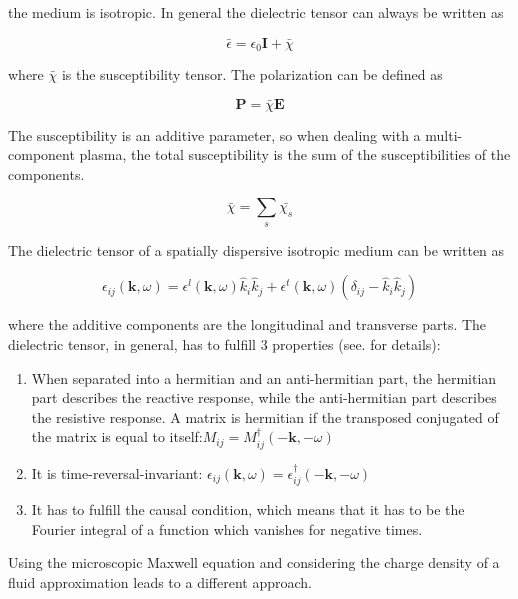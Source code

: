 \documentclass[a4paper,11pt]{article}
\begin{document}
the medium is isotropic. In general the dielectric tensor can always be written as

\begin{equation}
    \bar{\epsilon}=\epsilon_0\mathbf{I}+\bar{\chi}
\end{equation}

where $\bar{\chi}$ is the susceptibility tensor. The polarization can be defined as

\begin{equation}
    \mathbf{P}=\bar{\chi} \mathbf{E}
\end{equation}

The susceptibility is an additive parameter, so when dealing with a multi-component plasma, the total susceptibility is the sum of the susceptibilities of the components.

\begin{equation}
    \bar{\chi}=\sum_s \bar{\chi_s}
\end{equation}


The dielectric tensor of a spatially dispersive isotropic medium can be written as

\begin{equation}
   \epsilon_{ij}(\mathbf{k},\omega)=\epsilon^l(\mathbf{k},\omega)\hat{k}_i \hat{k}_j+\epsilon^t(\mathbf{k},\omega)(\delta_{ij}-\hat{k}_i \hat{k}_j)
\end{equation}

where the additive components are the longitudinal and transverse parts. The dielectric tensor, in general, has to fulfill 3 properties (see. \cite{melrose1} for details):

\begin{enumerate}
    \item When separated into a hermitian and an anti-hermitian part, the hermitian part describes the reactive response, while the anti-hermitian part describes the resistive response. A matrix is hermitian if the transposed conjugated of the matrix is equal to itself:$M_{ij}=M_{ij}^\dagger (-\mathbf{k},-\omega)$
\item It is time-reversal-invariant: $\epsilon_{ij}(\mathbf{k},\omega)=\epsilon_{ij}^\dagger (-\mathbf{k},-\omega)$
\item It has to fulfill the causal condition, which means that it has to be the Fourier integral of a function which vanishes for negative times.
\end{enumerate}

Using the microscopic Maxwell equation and considering the charge density of a fluid approximation leads to a different approach.
\end{document}
